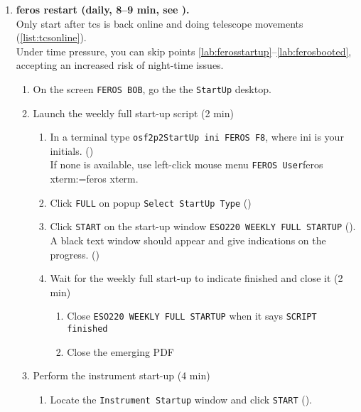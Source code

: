 \documentclass[11pt,fleqn,a4paper]{book}
\makeatletter
\def\menu#1#2{\texttt{#1}\ifx{}#2\else\@for\@x:=#2\do{$\rightarrow$\texttt{\@x}}\fi}
\def\mmenu#1#2{left-click mouse menu \menu{#1}{#2}}
\makeatother
\begin{document}
\begin{enumerate}
\begin{enumerate}
\begin{enumerate}
          \end{enumerate}
        \end{enumerate}
  \item \textbf{\gls{feros} restart (daily, 8--9 min, see ).}\\
        Only start after \gls{tcs} is back online and doing telescope movements (\ref{list:tcsonline}).\\
        Under time pressure, you can skip points \ref{lab:ferosstartup}--\ref{lab:ferosbooted}, accepting an increased risk of night-time issues.
        \label{list:feros}
        \begin{enumerate}
         \item \label{lab:ferosstartup} On the screen \texttt{FEROS BOB},  go the the \texttt{StartUp} \gls{desktop}.
         \item Launch the weekly full start-up script (2 min)
         \begin{enumerate}
            \item In a terminal type \texttt{\gls{osf2p2StartUp} ini FEROS F8}, where ini is your initials. ()\\
               If none is available, use \mmenu{FEROS User}{feros xterm}.
            \item Click \texttt{FULL} on popup \texttt{Select StartUp Type} ()
            \item Click \texttt{START} on the start-up window \texttt{ESO220 WEEKLY FULL STARTUP} ().\\
               A black text window should appear and give indications on the progress. ()
             \item Wait for the weekly full start-up to indicate finished and close it (2 min)
                \begin{enumerate}
                   \item Close \texttt{ESO220 WEEKLY FULL STARTUP} when it says \texttt{SCRIPT finished} 
                   \item Close the emerging PDF
                \end{enumerate}
            \end{enumerate}
         \item Perform the instrument start-up (4 min) 
            \begin{enumerate}
                \item Locate the \texttt{Instrument Startup} window and click \texttt{START} ().

\end{enumerate}
\end{enumerate}
\end{enumerate}
\end{document}
